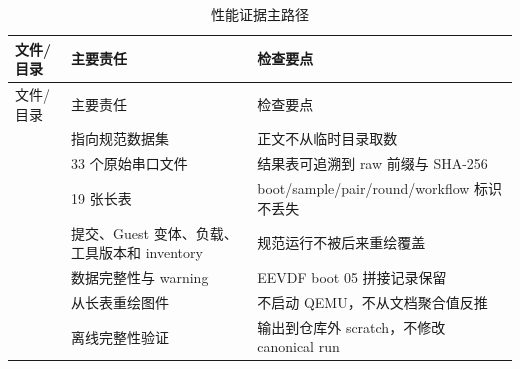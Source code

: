 \begin{longtable}{L{3.8cm}L{3.3cm}L{6.2cm}}
  \caption{性能证据主路径}\label{tab:source-performance}\\
  \toprule
  文件/目录 & 主要责任 & 检查要点 \\
  \midrule
  \endfirsthead
  \toprule
  文件/目录 & 主要责任 & 检查要点 \\
  \midrule
  \endhead
   & 指向规范数据集 & 正文不从临时目录取数 \\
   & 33 个原始串口文件 & 结果表可追溯到 raw 前缀与 SHA-256 \\
   & 19 张长表 & boot/sample/pair/round/workflow 标识不丢失 \\
   & 提交、Guest 变体、负载、工具版本和 inventory & 规范运行不被后来重绘覆盖 \\
   & 数据完整性与 warning & EEVDF boot 05 拼接记录保留 \\
   & 从长表重绘图件 & 不启动 QEMU，不从文档聚合值反推 \\
   & 离线完整性验证 & 输出到仓库外 scratch，不修改 canonical run \\
  \bottomrule
\end{longtable}
